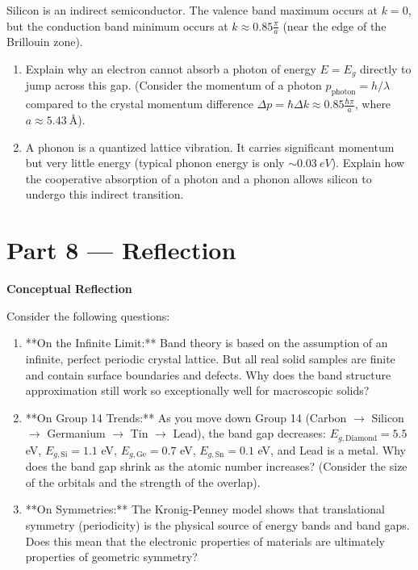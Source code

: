 \documentclass[12pt, a4paper]{book}
\begin{document}
\begin{deepbox}
\begin{enumerate}[label=\textbf{D\arabic*.}]
        Silicon is an indirect semiconductor. The valence band maximum occurs at $k = 0$, but the conduction band minimum occurs at $k \approx 0.85 \frac{\pi}{a}$ (near the edge of the Brillouin zone).
        \begin{enumerate}[label=(\alph*)]
          \item Explain why an electron cannot absorb a photon of energy $E = E_g$ directly to jump across this gap. (Consider the momentum of a photon $p_{\text{photon}} = h/\lambda$ compared to the crystal momentum difference $\Delta p = \hbar \Delta k \approx 0.85 \frac{\hbar\pi}{a}$, where $a \approx \SI{5.43}{\text{\AA}}$).
          \item A phonon is a quantized lattice vibration. It carries significant momentum but very little energy (typical phonon energy is only $\sim \SI{0.03}{eV}$).
                Explain how the cooperative absorption of a photon and a phonon allows silicon to undergo this indirect transition.
        \end{enumerate}
\end{enumerate}
\end{deepbox}

\newpage

\section{Part 8 --- Reflection}

\begin{reflectionbox}
\textbf{Conceptual Reflection}

Consider the following questions:
\begin{enumerate}
  \item **On the Infinite Limit:** Band theory is based on the assumption of an infinite, perfect periodic crystal lattice. But all real solid samples are finite and contain surface boundaries and defects. Why does the band structure approximation still work so exceptionally well for macroscopic solids?
  \item **On Group 14 Trends:** As you move down Group 14 (Carbon $\to$ Silicon $\to$ Germanium $\to$ Tin $\to$ Lead), the band gap decreases: $E_{g,\text{Diamond}} = 5.5$ eV, $E_{g,\text{Si}} = 1.1$ eV, $E_{g,\text{Ge}} = 0.7$ eV, $E_{g,\text{Sn}} = 0.1$ eV, and Lead is a metal. Why does the band gap shrink as the atomic number increases? (Consider the size of the orbitals and the strength of the overlap).
  \item **On Symmetries:** The Kronig-Penney model shows that translational symmetry (periodicity) is the physical source of energy bands and band gaps. Does this mean that the electronic properties of materials are ultimately properties of geometric symmetry?
\end{enumerate}
\end{reflectionbox}
\end{document}
